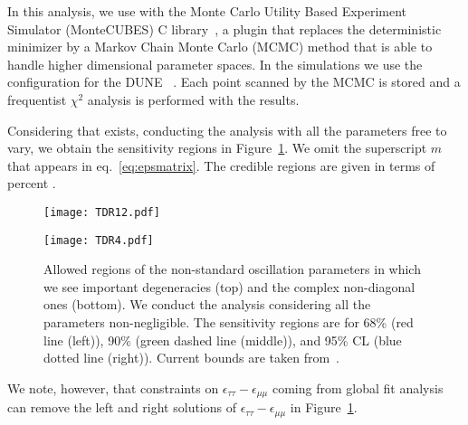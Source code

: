 In this analysis, we use   with the Monte Carlo Utility Based Experiment Simulator (MonteCUBES) C library~\cite{Blennow:2009pk}, a plugin that replaces the deterministic   minimizer by a Markov Chain Monte Carlo (MCMC) method that is able to handle higher dimensional parameter spaces. In the simulations we use the configuration for the DUNE ~\cite{Alion:2016uaj}. Each point scanned by the MCMC is stored and a frequentist $\chi^2$ analysis is performed with the results.

Considering that   exists, conducting the analysis with all the   parameters free to vary, we obtain the sensitivity regions in Figure~\ref{fig:nsi}. We omit the superscript $m$ that appears in eq.~\ref{eq:epsmatrix}. 
The credible regions are given in terms of percent .
\begin{figure}[!htb]
	\centering
    \texttt{[image: TDR12.pdf]}
    
    \texttt{[image: TDR4.pdf]}
   \caption[NSI parameters. Allowed regions.]{\label{fig:nsi}Allowed regions of the non-standard oscillation parameters in which we see important degeneracies (top) and the complex non-diagonal ones (bottom). We conduct the analysis considering all the   parameters non-negligible. The sensitivity regions are for 68\% (red line (left)), 90\% (green dashed line (middle)), and 95\% CL (blue dotted line (right)). Current bounds are taken from~\cite{Gonzalez-Garcia:2013usa}.}
\end{figure}
We note, however, that constraints on $\epsilon_{\tau\tau}-\epsilon_{\mu\mu}$ coming from global fit analysis~\cite{Gonzalez-Garcia:2013usa,Miranda:2015dra,Farzan:2017xzy,Esteban:2018ppq} can remove the left and right solutions of $\epsilon_{\tau\tau}-\epsilon_{\mu\mu}$ in Figure~\ref{fig:nsi}.

